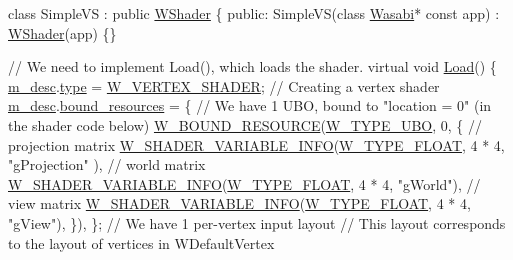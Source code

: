\begin{DoxyCode}
\textcolor{keyword}{class }SimpleVS : \textcolor{keyword}{public} \hyperlink{class_w_shader}{WShader} \{
\textcolor{keyword}{public}:
    SimpleVS(\textcolor{keyword}{class} \hyperlink{class_wasabi}{Wasabi}* \textcolor{keyword}{const} app) : \hyperlink{class_w_shader}{WShader}(app) \{\}

    \textcolor{comment}{// We need to implement Load(), which loads the shader.}
    \textcolor{keyword}{virtual} \textcolor{keywordtype}{void} \hyperlink{class_w_shader_a7ce478193bc1676b1a7fdd741bdb32aa}{Load}() \{
        \hyperlink{class_w_shader_a887bf7b5a672bcc901eb8999713d8cfe}{m\_desc}.\hyperlink{struct_w___s_h_a_d_e_r___d_e_s_c_ad7b83db0ce3b5eb747a0fea76b52acd5}{type} = \hyperlink{group__engineclass_gga8a79e4a3a441c88450e176150102c7b7a931690c7bb781b1a1c0cfac827e2cacf}{W\_VERTEX\_SHADER}; \textcolor{comment}{// Creating a vertex shader}
        \hyperlink{class_w_shader_a887bf7b5a672bcc901eb8999713d8cfe}{m\_desc}.\hyperlink{struct_w___s_h_a_d_e_r___d_e_s_c_aa3fea1cc775493c0fe9590129f91df63}{bound\_resources} = \{
            \textcolor{comment}{// We have 1 UBO, bound to "location = 0" (in the shader code below)}
            \hyperlink{group__engineclass_gafbfee122f0f44bd16c3369f295e95aae}{W\_BOUND\_RESOURCE}(\hyperlink{group__engineclass_gga6f7d88d2bbec56561a4b13c4e6604893af36b467046e1fae5dff40f5a2c15162c}{W\_TYPE\_UBO}, 0, \{
                \textcolor{comment}{// projection matrix}
                \hyperlink{group__engineclass_gac58914f40a8d012635bf7704c3a74409}{W\_SHADER\_VARIABLE\_INFO}(\hyperlink{group__engineclass_ggaeca2b79f62ba669ae9c5dbc516b66522ae4539d4f3784b6d80f44e9dd4867fa00}{W\_TYPE\_FLOAT}, 4 * 4, \textcolor{stringliteral}{"gProjection"}
      ),
                \textcolor{comment}{// world matrix}
                \hyperlink{group__engineclass_gac58914f40a8d012635bf7704c3a74409}{W\_SHADER\_VARIABLE\_INFO}(\hyperlink{group__engineclass_ggaeca2b79f62ba669ae9c5dbc516b66522ae4539d4f3784b6d80f44e9dd4867fa00}{W\_TYPE\_FLOAT}, 4 * 4, \textcolor{stringliteral}{"gWorld"}),
                \textcolor{comment}{// view matrix}
                \hyperlink{group__engineclass_gac58914f40a8d012635bf7704c3a74409}{W\_SHADER\_VARIABLE\_INFO}(\hyperlink{group__engineclass_ggaeca2b79f62ba669ae9c5dbc516b66522ae4539d4f3784b6d80f44e9dd4867fa00}{W\_TYPE\_FLOAT}, 4 * 4, \textcolor{stringliteral}{"gView"}),
            \}),
        \};
        \textcolor{comment}{// We have 1 per-vertex input layout}
        \textcolor{comment}{// This layout corresponds to the layout of vertices in WDefaultVertex}

\end{DoxyCode}
